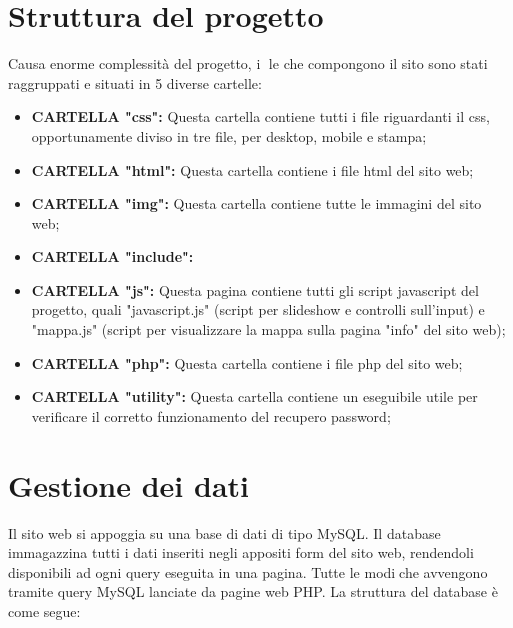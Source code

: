 \section{Struttura del progetto}

Causa enorme complessità del progetto, i le che compongono il sito sono stati
raggruppati e situati in 5 diverse cartelle:

\begin{itemize}
	\item \textbf{CARTELLA "css":} Questa cartella contiene tutti i file riguardanti il css, opportunamente diviso in tre file, per desktop, mobile e stampa;
	\item \textbf{CARTELLA "html":} Questa cartella contiene i file html del sito web;
	\item \textbf{CARTELLA "img":} Questa cartella contiene tutte le immagini del sito
	web;
	\item \textbf{CARTELLA "include":}
	\item \textbf{CARTELLA "js":} Questa pagina contiene tutti gli script javascript
	del progetto, quali "javascript.js" (script per slideshow e controlli sull'input) e "mappa.js" (script per visualizzare la mappa sulla pagina "info" del sito
	web);
	\item \textbf{CARTELLA "php":} Questa cartella contiene i file php del sito
	web;
	\item \textbf{CARTELLA "utility":} Questa cartella contiene un eseguibile utile per verificare il corretto funzionamento del recupero password;
\end{itemize}

\section{Gestione dei dati}

Il sito web si appoggia su una base di dati di tipo MySQL. Il database immagazzina
tutti i dati inseriti negli appositi form del sito web, rendendoli disponibili ad ogni
query eseguita in una pagina. Tutte le modiche avvengono tramite query MySQL
lanciate da pagine web PHP. La struttura del database è come segue:

